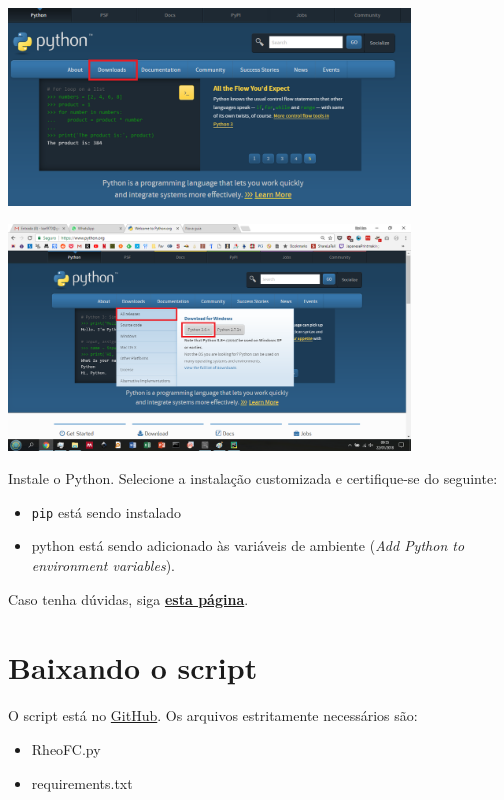 \documentclass[a4paper, 12pt]{article}
\begin{document}
\begin{center}
\includegraphics[width = 0.8\textwidth]{Pyt1}
\end{center}

\begin{center}
\includegraphics[width = 0.8\textwidth]{Pyt2}
\end{center}

Instale o Python. Selecione a instalação customizada e certifique-se do seguinte:

\begin{itemize}
\item \texttt{pip} está sendo instalado
\item python está sendo adicionado às variáveis de ambiente (\emph{Add Python to environment variables}).
\end{itemize}

Caso tenha dúvidas, siga \href{https://docs.python.org/3/using/windows.html}{\textbf{esta página}}.

\section{Baixando o script}

O script está no \href{https://github.com/KarlClinckspoor/Miscellaneous/tree/master/Rheology}{GitHub}. Os arquivos estritamente necessários são:

\begin{itemize}
\item RheoFC.py
\item requirements.txt
\end{itemize}
\end{document}
